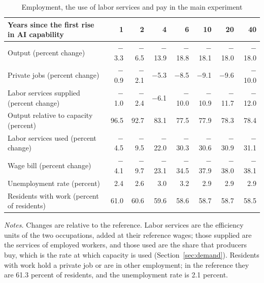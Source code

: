 \begin{table}[htbp]\centering\small
\caption{Employment, the use of labor services and pay in the main experiment}\label{tab:adjustment}
\begin{tabularx}{\linewidth}{@{}>{\raggedright\arraybackslash}Xrrrrrrr@{}}\toprule
Years since the first rise in AI capability & 1 & 2 & 4 & 6 & 10 & 20 & 40 \\\midrule
Output (percent change) & $-$3.3 & $-$6.5 & $-$13.9 & $-$18.8 & $-$18.1 & $-$18.0 & $-$18.0 \\
Private jobs (percent change) & $-$0.9 & $-$2.1 & $-$5.3 & $-$8.5 & $-$9.1 & $-$9.6 & $-$10.0 \\
Labor services supplied (percent change) & $-$1.0 & $-$2.4 & $-$6.1 & $-$10.0 & $-$10.9 & $-$11.7 & $-$12.0 \\
Output relative to capacity (percent) & 96.5 & 92.7 & 83.1 & 77.5 & 77.9 & 78.3 & 78.4 \\
Labor services used (percent change) & $-$4.5 & $-$9.5 & $-$22.0 & $-$30.3 & $-$30.6 & $-$30.9 & $-$31.1 \\
Wage bill (percent change) & $-$4.1 & $-$9.7 & $-$23.1 & $-$34.5 & $-$37.9 & $-$38.0 & $-$38.1 \\
Unemployment rate (percent) & 2.4 & 2.6 & 3.0 & 3.2 & 2.9 & 2.9 & 2.9 \\
Residents with work (percent of residents) & 61.0 & 60.6 & 59.6 & 58.6 & 58.7 & 58.7 & 58.5 \\
\bottomrule\end{tabularx}
\par\smallskip\begin{minipage}{\linewidth}\footnotesize\emph{Notes.} Changes are relative to the reference. Labor services are the efficiency units of the two occupations, added at their reference wages; those supplied are the services of employed workers, and those used are the share that producers buy, which is the rate at which capacity is used (Section~\ref{sec:demand}). Residents with work hold a private job or are in other employment; in the reference they are 61.3 percent of residents, and the unemployment rate is 2.1 percent.\end{minipage}
\end{table}

